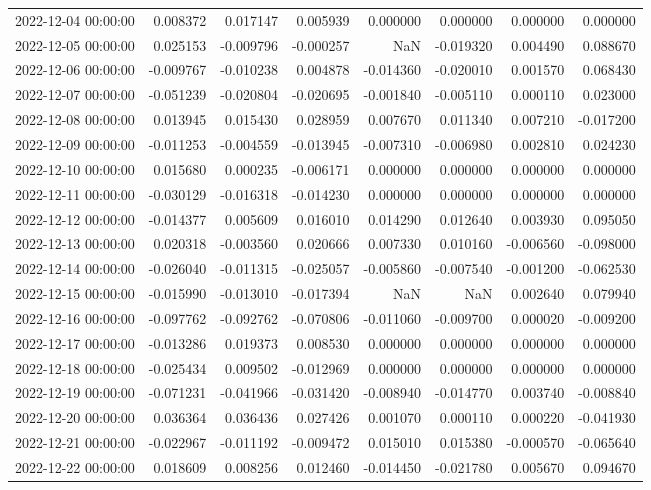 \begin{tabular}{lrrrrrrr}
2022-12-04 00:00:00 & 0.008372 & 0.017147 & 0.005939 & 0.000000 & 0.000000 & 0.000000 & 0.000000 \\
2022-12-05 00:00:00 & 0.025153 & -0.009796 & -0.000257 & NaN & -0.019320 & 0.004490 & 0.088670 \\
2022-12-06 00:00:00 & -0.009767 & -0.010238 & 0.004878 & -0.014360 & -0.020010 & 0.001570 & 0.068430 \\
2022-12-07 00:00:00 & -0.051239 & -0.020804 & -0.020695 & -0.001840 & -0.005110 & 0.000110 & 0.023000 \\
2022-12-08 00:00:00 & 0.013945 & 0.015430 & 0.028959 & 0.007670 & 0.011340 & 0.007210 & -0.017200 \\
2022-12-09 00:00:00 & -0.011253 & -0.004559 & -0.013945 & -0.007310 & -0.006980 & 0.002810 & 0.024230 \\
2022-12-10 00:00:00 & 0.015680 & 0.000235 & -0.006171 & 0.000000 & 0.000000 & 0.000000 & 0.000000 \\
2022-12-11 00:00:00 & -0.030129 & -0.016318 & -0.014230 & 0.000000 & 0.000000 & 0.000000 & 0.000000 \\
2022-12-12 00:00:00 & -0.014377 & 0.005609 & 0.016010 & 0.014290 & 0.012640 & 0.003930 & 0.095050 \\
2022-12-13 00:00:00 & 0.020318 & -0.003560 & 0.020666 & 0.007330 & 0.010160 & -0.006560 & -0.098000 \\
2022-12-14 00:00:00 & -0.026040 & -0.011315 & -0.025057 & -0.005860 & -0.007540 & -0.001200 & -0.062530 \\
2022-12-15 00:00:00 & -0.015990 & -0.013010 & -0.017394 & NaN & NaN & 0.002640 & 0.079940 \\
2022-12-16 00:00:00 & -0.097762 & -0.092762 & -0.070806 & -0.011060 & -0.009700 & 0.000020 & -0.009200 \\
2022-12-17 00:00:00 & -0.013286 & 0.019373 & 0.008530 & 0.000000 & 0.000000 & 0.000000 & 0.000000 \\
2022-12-18 00:00:00 & -0.025434 & 0.009502 & -0.012969 & 0.000000 & 0.000000 & 0.000000 & 0.000000 \\
2022-12-19 00:00:00 & -0.071231 & -0.041966 & -0.031420 & -0.008940 & -0.014770 & 0.003740 & -0.008840 \\
2022-12-20 00:00:00 & 0.036364 & 0.036436 & 0.027426 & 0.001070 & 0.000110 & 0.000220 & -0.041930 \\
2022-12-21 00:00:00 & -0.022967 & -0.011192 & -0.009472 & 0.015010 & 0.015380 & -0.000570 & -0.065640 \\
2022-12-22 00:00:00 & 0.018609 & 0.008256 & 0.012460 & -0.014450 & -0.021780 & 0.005670 & 0.094670 \\

\end{tabular}
